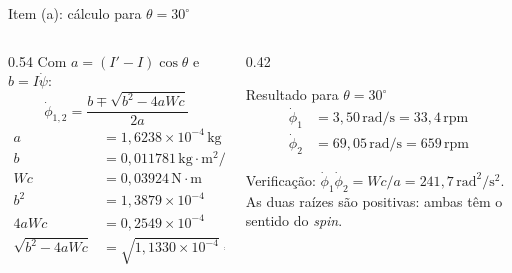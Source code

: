 \documentclass[11pt,aspectratio=169]{beamer}
\newcommand{\un}[1]{\,\mathrm{#1}}
\newcommand{\phid}{\dot{\phi}}
\newcommand{\psid}{\dot{\psi}}
\begin{document}
\begin{frame}{Item (a): cálculo para $\theta=30^\circ$}
  \begin{columns}[c]
    \begin{column}{0.54\textwidth}
      Com $a=(I'-I)\cos\theta$ e $b=I\psid$:
      \[
        \phid_{1,2}=\frac{b\mp\sqrt{b^2-4aWc}}{2a}
      \]
      \begin{align*}
        a &= 1,6238\times10^{-4}\un{kg\cdot m^2}\\
        b &= 0,011781\un{kg\cdot m^2/s}\\
        Wc &= 0,03924\un{N\cdot m}\\
        b^2 &= 1,3879\times10^{-4}\\
        4aWc &= 0,2549\times10^{-4}\\
        \sqrt{b^2-4aWc} &= \sqrt{1,1330\times10^{-4}}=0,010644
      \end{align*}
    \end{column}
    \begin{column}{0.42\textwidth}
      \begin{block}{Resultado para $\theta=30^\circ$}
        \begin{align*}
          \phid_1 &= 3,50\un{rad/s}=33,4\un{rpm}\\
          \phid_2 &= 69,05\un{rad/s}=659\un{rpm}
        \end{align*}
      \end{block}
      \vspace{0.2cm}
      {\small Verificação: $\phid_1\phid_2=Wc/a=241,7\un{rad^2/s^2}$.\\[0.1cm]
      As duas raízes são positivas: ambas têm o sentido do \textit{spin}.}
    \end{column}
  \end{columns}
\end{frame}
\end{document}

